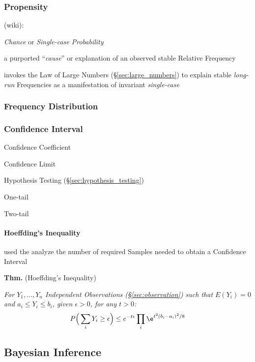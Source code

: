 \subsubsection{Propensity}\label{sec:propensity}

(wiki):

\emph{Chance} or \emph{Single-case Probability}

a purported ``\emph{cause}'' or explanation of an observed stable Relative
Frequency

invokes the Law of Large Numbers (\S\ref{sec:large_numbers}) to explain stable
\emph{long-run} Frequencies as a manifestation of invariant \emph{single-case}



\subsubsection{Frequency Distribution}\label{sec:frequency_distribution}

\subsubsection{Confidence Interval}\label{sec:confidence_interval}

Confidence Coefficient

Confidence Limit

Hypothesis Testing (\S\ref{sec:hypothesis_testing})

One-tail

Two-tail



\paragraph{Hoeffding's Inequality}\label{sec:hoeffdings_inequality}\hfill

used the analyze the number of required Samples needed to obtain a Confidence
Interval

\textbf{Thm.} (Hoeffding's Inequality)

\emph{
  For $Y_1, \ldots, Y_n$ Independent Observations (\S\ref{sec:observation}) such
  that $E(Y_i) = 0$ and $a_i \leq Y_i \leq b_i$, given $\epsilon > 0$, for any $t
  > 0$:
  \[
    P\Big(\sum_i Y_i \geq \epsilon\Big) \leq
      e^{-t\epsilon} \prod_i \e^{t^2(b_i - a_i)^2/8}
  \]
}



\subsection{Bayesian Inference}\label{sec:bayesian_inference}

